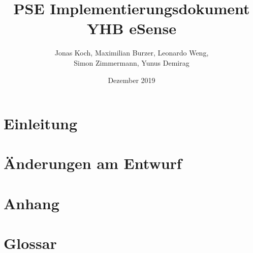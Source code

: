 \documentclass[12pt,a4paper,titlepage,ngerman]{article}
\title{PSE Implementierungsdokument YHB eSense}
\author{Jonas Koch, Maximilian Burzer, Leonardo Weng, \\ Simon Zimmermann, Yunus Demirag}
\date{Dezember 2019}
\begin{document}
	
	\part{Einleitung}
	
	\part{Änderungen am Entwurf}
	
	
	
	
	
	
	
	
	
	\part{Anhang}
	
	\part{Glossar}
	
\end{document}
